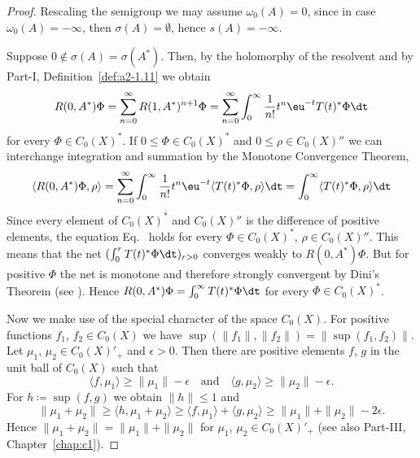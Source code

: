 \begin{proof}
Rescaling the semigroup we may assume $\omega_{0}(A) = 0$, 
since in case $\omega_{0}(A) = -\infty$, then $\sigma(A) = \emptyset$, hence $s(A) = -\infty$.

Suppose $0 \notin \sigma(A) = \sigma(A^*)$. 
Then, by the holomorphy of the resolvent and by Part-I, Definition~\ref{def:a2-1.11} we obtain
\[
   R(0,A^*)\Phi = \sum_{n=0}^{\infty} R(1,A^*)^{n+1}\Phi = \sum_{n=0}^{\infty} \int_0^{\infty} \frac{1}{n!} t^n \eu^{-t}T(t)^*\Phi \dt
\]  
 for every  $\Phi \in C_{0}(X)^*$. 
 If\/ $0 \leq \Phi \in C_{0}(X)^*$ and $0 \leq \rho \in C_{0}(X)''$ we can interchange integration and summation by the Monotone Convergence Theorem, \ie
\begin{equation}\label{eq:b4-1.3}
   \langle R(0,A^*)\Phi,\rho \rangle = \sum_{n=0}^{\infty} \int_0^{\infty} \frac{1}{n!} t^n \eu^{-t}\langle T(t)^*\Phi,\rho \rangle \dt = \int_0^{\infty} \langle T(t)^*\Phi,\rho \rangle \dt
\end{equation}
Since every element of\/ $C_{0}(X)^*$ and $C_{0}(X)''$ is the difference of positive
elements, the equation Eq.~ holds for every $\Phi \in C_{0}(X)^*$, $\rho \in C_{0}(X)''$. 
This means that the net $(\int_0^r T(t)^*\Phi \dt)_{r > 0}$ converges weakly to $R(0,A^*)\Phi$. 
But for positive $\Phi$ the net is monotone and therefore strongly convergent by Dini's Theorem (see \textcite[II.Theorem~5.9]{schaefer:1974}). 
Hence $R(0,A^*)\Phi = \int_0^{\infty} T(t)^*\Phi \dt$ for every $\Phi \in C_{0}(X)^*$.

Now we make use of the special character of the space $C_{0}(X)$. 
For positive functions $f_1$, $f_2 \in C_{0}(X)$ we have $\sup(\|f_1\|,\|f_2\|) = \|\sup(f_1,f_2)\|$. 
Let $\mu_1$, $\mu_2 \in C_{0}(X)'_+$ and $\epsilon  >  0$. 
Then there are positive elements $f$, $g$ in the unit ball of\/ $C_{0}(X)$ such that 
%
\[
	\langle f,\mu_1 \rangle \geq \|\mu_1\| - \epsilon 
	\quad \text{and} \quad
	\langle g,\mu_2 \rangle \geq \|\mu_2\| - \epsilon.
\]
%
For $h \coloneq \sup(f,g)$ we obtain $\|h\| \leq 1$ and 
%
\[
	 \|\mu_1 + \mu_2\| \geq \langle h,\mu_1 + \mu_2 \rangle \geq \langle f,\mu_1 \rangle + \langle g,\mu_2 \rangle \geq \|\mu_1\| + \|\mu_2\| - 2\epsilon .
\]
%
Hence $\|\mu_1 + \mu_2\| = \|\mu_1\| + \|\mu_2\|$ for $\mu_1$, $\mu_2 \in C_{0}(X)'_+$ (see also Part-III, Chapter~\ref{chap:c1}).


\end{proof}
